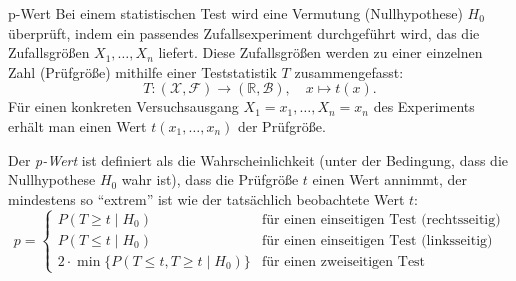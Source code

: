 \begin{defi}{p-Wert}
    Bei einem statistischen Test wird eine Vermutung (Nullhypothese) $H_0$ überprüft, indem ein passendes Zufallsexperiment durchgeführt wird, das die Zufallsgrößen $X_1, \ldots, X_n$ liefert.
    Diese Zufallsgrößen werden zu einer einzelnen Zahl (Prüfgröße) mithilfe einer Teststatistik $T$ zusammengefasst:
    \[
        T: (\mathcal{X}, \mathcal{F}) \to (\mathbb{R}, \mathcal{B}), \quad x \mapsto t(x).
    \]
    Für einen konkreten Versuchsausgang $X_1 = x_1, \ldots, X_n = x_n$ des Experiments erhält man einen Wert $t(x_1, \ldots, x_n)$ der Prüfgröße.

    Der \emph{p-Wert} ist definiert als die Wahrscheinlichkeit (unter der Bedingung, dass die Nullhypothese $H_0$ wahr ist), dass die Prüfgröße $t$ einen Wert annimmt, der mindestens so \enquote{extrem} ist wie der tatsächlich beobachtete Wert $t$:
    \[
        p = \begin{cases}
            P(T \geq t \mid H_0)                              & \text{für einen einseitigen Test (rechtsseitig)} \\
            P(T \leq t \mid H_0)                              & \text{für einen einseitigen Test (linksseitig)}  \\
            2 \cdot \min \{ P(T \leq t, T \geq t \mid H_0) \} & \text{für einen zweiseitigen Test}
        \end{cases}
    \]
\end{defi}

